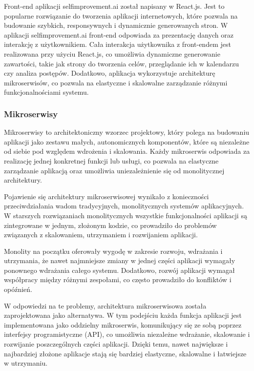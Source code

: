 Front-end aplikacji selfimprovement.ai został napisany w React.js. Jest to popularne rozwiązanie do tworzenia aplikacji internetowych, które pozwala na budowanie szybkich, responsywnych i dynamicznie generowanych stron. W aplikacji selfimprovement.ai front-end odpowiada za prezentację danych oraz interakcję z użytkownikiem. Cała interakcja użytkownika \linebreak z front-endem jest realizowana przy użyciu React.js, co umożliwia dynamiczne generowanie zawartości, takie jak strony do tworzenia celów, przeglądanie ich w kalendarzu czy analiza postępów. Dodatkowo, aplikacja wykorzystuje architekturę mikroserwisów, co pozwala na elastyczne i skalowalne zarządzanie różnymi funkcjonalnościami systemu.

\subsubsection{Mikroserwisy}

Mikroserwisy to architektoniczny wzorzec projektowy, który polega na budowaniu aplikacji jako zestawu małych, autonomicznych komponentów, które są niezależne od siebie pod względem wdrożenia i skalowania. Każdy mikroserwis odpowiada za realizację jednej konkretnej funkcji lub usługi, co pozwala na elastyczne zarządzanie aplikacją oraz umożliwia uniezależnienie się od monolitycznej architektury.

Pojawienie się architektury mikroserwisowej wynikało z konieczności przeciwdziałania wadom tradycyjnych, monolitycznych systemów aplikacyjnych. W starszych rozwiązaniach monolitycznych wszystkie funkcjonalności aplikacji są zintegrowane w jednym, złożonym kodzie, co prowadziło do problemów związanych z skalowaniem, utrzymaniem i rozwijaniem aplikacji.

Monolity na początku oferowały wygodę w zakresie rozwoju, wdrażania i utrzymania, że nawet najmniejsze zmiany w jednej części aplikacji wymagały ponownego wdrażania całego systemu. Dodatkowo, rozwój aplikacji wymagał współpracy między różnymi zespołami, co często prowadziło do konfliktów i opóźnień.

W odpowiedzi na te problemy, architektura mikroserwisowa została zaprojektowana jako alternatywa. W tym podejściu każda funkcja aplikacji jest implementowana jako oddzielny mikroserwis, komunikujący się ze sobą poprzez interfejsy programistyczne (API), co umożliwia niezależne wdrażanie, skalowanie i rozwijanie poszczególnych części aplikacji. Dzięki temu, nawet największe i najbardziej złożone aplikacje stają się bardziej elastyczne, skalowalne i łatwiejsze w utrzymaniu.


